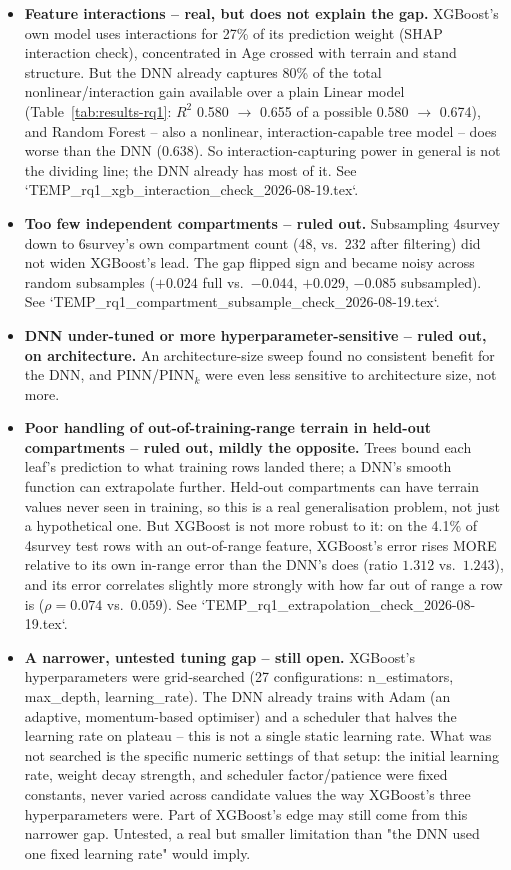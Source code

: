 \begin{itemize}
\item \textbf{Feature interactions -- real, but does not explain the gap.} XGBoost's own model
uses interactions for 27\% of its prediction weight (SHAP interaction check), concentrated in Age
crossed with terrain and stand structure. But the DNN already captures 80\% of the total
nonlinear/interaction gain available over a plain Linear model (Table~\ref{tab:results-rq1}:
$R^2$ 0.580 $\to$ 0.655 of a possible 0.580 $\to$ 0.674), and Random Forest -- also a nonlinear,
interaction-capable tree model -- does worse than the DNN (0.638). So interaction-capturing power
in general is not the dividing line; the DNN already has most of it. See
`TEMP_rq1_xgb_interaction_check_2026-08-19.tex`.
\item \textbf{Too few independent compartments -- ruled out.} Subsampling 4survey down to
6survey's own compartment count (48, vs.\ 232 after filtering) did not widen XGBoost's lead. The
gap flipped sign and became noisy across random subsamples ($+0.024$ full vs.\ $-0.044$, $+0.029$,
$-0.085$ subsampled). See `TEMP_rq1_compartment_subsample_check_2026-08-19.tex`.
\item \textbf{DNN under-tuned or more hyperparameter-sensitive -- ruled out, on architecture.} An
architecture-size sweep found no consistent benefit for the DNN, and PINN/PINN$_k$ were even less
sensitive to architecture size, not more.
\item \textbf{Poor handling of out-of-training-range terrain in held-out compartments -- ruled
out, mildly the opposite.} Trees bound each leaf's prediction to what training rows landed there;
a DNN's smooth function can extrapolate further. Held-out compartments can have terrain values
never seen in training, so this is a real generalisation problem, not just a hypothetical one. But
XGBoost is not more robust to it: on the 4.1\% of 4survey test rows with an out-of-range feature,
XGBoost's error rises MORE relative to its own in-range error than the DNN's does (ratio $1.312$
vs.\ $1.243$), and its error correlates slightly more strongly with how far out of range a row is
($\rho=0.074$ vs.\ $0.059$). See `TEMP_rq1_extrapolation_check_2026-08-19.tex`.
\item \textbf{A narrower, untested tuning gap -- still open.} XGBoost's hyperparameters were
grid-searched (27 configurations: n\_estimators, max\_depth, learning\_rate). The DNN already
trains with Adam (an adaptive, momentum-based optimiser) and a scheduler that halves the learning
rate on plateau -- this is not a single static learning rate. What was not searched is the
specific numeric settings of that setup: the initial learning rate, weight decay strength, and
scheduler factor/patience were fixed constants, never varied across candidate values the way
XGBoost's three hyperparameters were. Part of XGBoost's edge may still come from this narrower
gap. Untested, a real but smaller limitation than "the DNN used one fixed learning rate" would
imply.
\end{itemize}

